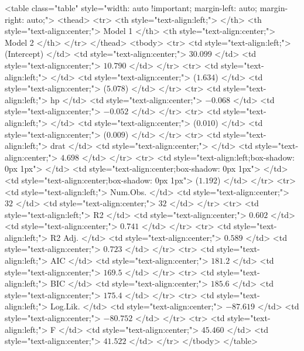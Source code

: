 <table class="table" style="width: auto !important; margin-left: auto; margin-right: auto;">
 <thead>
  <tr>
   <th style="text-align:left;">   </th>
   <th style="text-align:center;"> Model 1 </th>
   <th style="text-align:center;"> Model 2 </th>
  </tr>
 </thead>
<tbody>
  <tr>
   <td style="text-align:left;"> (Intercept) </td>
   <td style="text-align:center;"> $30.099$ </td>
   <td style="text-align:center;"> $10.790$ </td>
  </tr>
  <tr>
   <td style="text-align:left;">  </td>
   <td style="text-align:center;"> ($1.634$) </td>
   <td style="text-align:center;"> ($5.078$) </td>
  </tr>
  <tr>
   <td style="text-align:left;"> hp </td>
   <td style="text-align:center;"> $-0.068$ </td>
   <td style="text-align:center;"> $-0.052$ </td>
  </tr>
  <tr>
   <td style="text-align:left;">  </td>
   <td style="text-align:center;"> ($0.010$) </td>
   <td style="text-align:center;"> ($0.009$) </td>
  </tr>
  <tr>
   <td style="text-align:left;"> drat </td>
   <td style="text-align:center;">  </td>
   <td style="text-align:center;"> $4.698$ </td>
  </tr>
  <tr>
   <td style="text-align:left;box-shadow: 0px 1px">  </td>
   <td style="text-align:center;box-shadow: 0px 1px">  </td>
   <td style="text-align:center;box-shadow: 0px 1px"> ($1.192$) </td>
  </tr>
  <tr>
   <td style="text-align:left;"> Num.Obs. </td>
   <td style="text-align:center;"> $32$ </td>
   <td style="text-align:center;"> $32$ </td>
  </tr>
  <tr>
   <td style="text-align:left;"> R2 </td>
   <td style="text-align:center;"> $0.602$ </td>
   <td style="text-align:center;"> $0.741$ </td>
  </tr>
  <tr>
   <td style="text-align:left;"> R2 Adj. </td>
   <td style="text-align:center;"> $0.589$ </td>
   <td style="text-align:center;"> $0.723$ </td>
  </tr>
  <tr>
   <td style="text-align:left;"> AIC </td>
   <td style="text-align:center;"> $181.2$ </td>
   <td style="text-align:center;"> $169.5$ </td>
  </tr>
  <tr>
   <td style="text-align:left;"> BIC </td>
   <td style="text-align:center;"> $185.6$ </td>
   <td style="text-align:center;"> $175.4$ </td>
  </tr>
  <tr>
   <td style="text-align:left;"> Log.Lik. </td>
   <td style="text-align:center;"> $-87.619$ </td>
   <td style="text-align:center;"> $-80.752$ </td>
  </tr>
  <tr>
   <td style="text-align:left;"> F </td>
   <td style="text-align:center;"> $45.460$ </td>
   <td style="text-align:center;"> $41.522$ </td>
  </tr>
</tbody>
</table>
